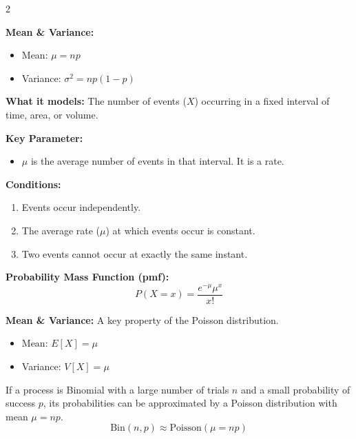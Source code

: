 \documentclass[10pt, letterpaper]{article}
\begin{document}
\begin{multicols}{2}
\begin{tcolorbox}[colback=white, colframe=black, boxrule=0.5pt, title=\textbf{Binomial Distribution: \(X \sim \text{Bin}(n, p)\)}]
\textbf{Mean \& Variance:}
\begin{itemize}[itemsep=0pt, topsep=0pt, partopsep=0pt]
    \item Mean: \(\mu = np\)
    \item Variance: \(\sigma^2 = np(1-p)\)
\end{itemize}
\end{tcolorbox}

\begin{tcolorbox}[colback=white, colframe=black, boxrule=0.5pt, title=\textbf{Poisson Distribution: \(X \sim \text{Poisson}(\mu)\)}]
\textbf{What it models:} The number of events (\(X\)) occurring in a fixed interval of time, area, or volume.

\textbf{Key Parameter:}
\begin{itemize}[itemsep=0pt, topsep=0pt, partopsep=0pt]
    \item \(\mu\) is the average number of events in that interval. It is a rate.
\end{itemize}

\textbf{Conditions:}
\begin{enumerate}[itemsep=0pt, topsep=0pt, partopsep=0pt]
    \item Events occur independently.
    \item The average rate (\(\mu\)) at which events occur is constant.
    \item Two events cannot occur at exactly the same instant.
\end{enumerate}

\textbf{Probability Mass Function (pmf):}
\[ P(X=x) = \frac{e^{-\mu}\mu^x}{x!} \]

\textbf{Mean \& Variance:}
A key property of the Poisson distribution.
\begin{itemize}[itemsep=0pt, topsep=0pt, partopsep=0pt]
    \item Mean: \(E[X] = \mu\)
    \item Variance: \(V[X] = \mu\)
\end{itemize}
\end{tcolorbox}

\begin{tcolorbox}[colback=white, colframe=black, boxrule=0.5pt, title=\textbf{Poisson Approximation to the Binomial}]
If a process is Binomial with a large number of trials \(n\) and a small probability of success \(p\), its probabilities can be approximated by a Poisson distribution with mean \(\mu = np\).
\[ \text{Bin}(n, p) \approx \text{Poisson}(\mu = np) \]
\end{tcolorbox}

\end{multicols}
\end{document}
